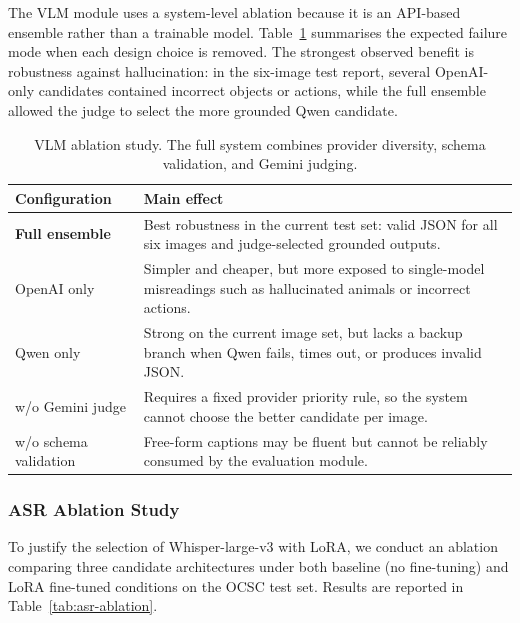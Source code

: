 \documentclass{article}
\begin{document}
The VLM module uses a system-level ablation because it is an API-based
ensemble rather than a trainable model. Table~\ref{tab:vlm-ablation}
summarises the expected failure mode when each design choice is removed.
The strongest observed benefit is robustness against hallucination: in
the six-image test report, several OpenAI-only candidates contained
incorrect objects or actions, while the full ensemble allowed the judge
to select the more grounded Qwen candidate.

\begin{table}[t]
\centering
\caption{VLM ablation study. The full system combines provider
diversity, schema validation, and Gemini judging.}
\label{tab:vlm-ablation}
\scriptsize
\setlength{\tabcolsep}{4pt}
\begin{tabular}{p{}p{}}
\toprule
\textbf{Configuration} & \textbf{Main effect}\\
\midrule
\textbf{Full ensemble} & Best robustness in the current test set:
valid JSON for all six images and judge-selected grounded outputs.\\
OpenAI only & Simpler and cheaper, but more exposed to single-model
misreadings such as hallucinated animals or incorrect actions.\\
Qwen only & Strong on the current image set, but lacks a backup branch
when Qwen fails, times out, or produces invalid JSON.\\
w/o Gemini judge & Requires a fixed provider priority rule, so the
system cannot choose the better candidate per image.\\
w/o schema validation & Free-form captions may be fluent but cannot be
reliably consumed by the evaluation module.\\
\bottomrule
\end{tabular}
\end{table}

\subsubsection{ASR Ablation Study}
\label{sec:asr-ablation}
 
To justify the selection of Whisper-large-v3 with LoRA, we conduct
an ablation comparing three candidate architectures under both
baseline (no fine-tuning) and LoRA fine-tuned conditions on the
OCSC test set.
Results are reported in Table~\ref{tab:asr-ablation}.
 
\end{document}
